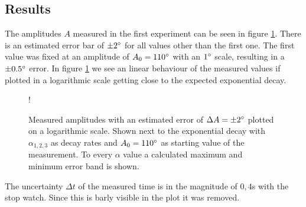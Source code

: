 \subsection{Results}

The amplitudes $A$ measured in the first experiment can be seen in figure \ref{fig::log}.
There is an estimated error bar of $\pm 2  \degree$  for all values other than the first one.
The first value was fixed at an amplitude of $A_0=110 \degree$  with an $1 \degree$ scale, resulting in a $\pm 0.5 \degree$ error.
In figure \ref{fig::log} we see an linear behaviour of the measured values if plotted in a logarithmic scale getting close to the expected exponential decay.


\begin{figure} [ht]

	\resizebox {\textwidth} {!}{}
	\caption{Measured amplitudes with an estimated error of $\Delta A = \pm2 \degree$  plotted on a logarithmic scale. Shown next to the exponential decay with $\alpha_{1, 2, 3}$ as decay rates and $A_0=110  \degree$  as starting value of the measurement. To every $\alpha$ value a calculated maximum and minimum error band is shown.}
	\label{fig::log}
\end{figure}

The uncertainty $\Delta t$ of the measured time is in the magnitude of $0,4$s with the stop watch.
Since this is barly visible in the plot it was removed.